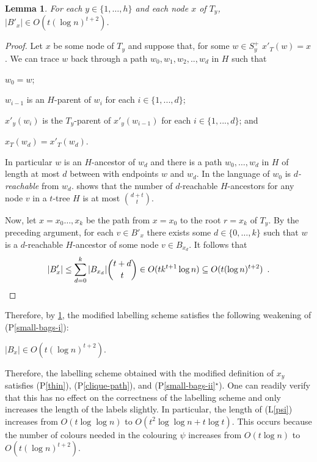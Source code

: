 \documentclass{article}
\newcommand{\pref}[1]{(P\ref{#1})}
\newcommand{\psref}[1]{(P\ref{#1}$^{\star}$)}
\newtheorem{lemma}{Lemma}
\begin{document}
\begin{lemma}\label{small-bags-ii-lem}
    For each $y\in\{1,\ldots,h\}$ and each node $x$ of $T_y$, $|B'_x|\in O(t(\log n)^{t+2})$.
\end{lemma}

\begin{proof}
    Let $x$ be some node of $T_y$ and suppose that, for some $w\in S^+_y$ $x'_T(w)=x$.  We can trace $w$ back through a path $w_0,w_1,w_2,..,w_d$ in $H$ such that
    \begin{compactenum}[(a)]
        \item $w_0=w$;
        \item $w_{i-1}$ is an $H$-parent of $w_i$ for each $i\in\{1,...,d\}$;
        \item $x'_y(w_{i})$ is the $T_y$-parent of $x'_y(w_{i-1})$ for each $i\in\{1,...,d\}$; and
        \item $x_T(w_d)=x'_T(w_d)$.
    \end{compactenum}
    In particular $w$ is an $H$-ancestor of $w_d$ and there is a path $w_0,\ldots,w_d$ in $H$ of length at most $d$ between with endpoints $w$ and $w_d$.  In the language of \citet{pilipczuk.siebertz:polynomial} $w_0$ is \emph{$d$-reachable} from $w_d$.  \citet[Lemma~13]{pilipczuk.siebertz:polynomial-arxiv} shows that the number of $d$-reachable $H$-ancestors for any node $v$ in a $t$-tree $H$ is at most $\binom{d+t}{t}$.

    Now, let $x=x_0\ldots,x_k$ be the path from $x=x_0$ to the root $r=x_k$ of $T_y$. By the preceding argument, for each $v\in B'_x$ there exists some $d\in\{0,\ldots,k\}$ such that $w$ is a $d$-reachable $H$-ancestor of some node $v\in B_{x_d}$.  It follows that
    \[
        |B'_x|
            \le \sum_{d=0}^k |B_{x_d}|\binom{t+d}{t}
            \in O(tk^{t+1}\log n)
            \subseteq O(t(\log n)^{t+2}) \enspace . \qedhere
    \]
\end{proof}

Therefore, by \cref{small-bags-ii-lem}, the modified labelling scheme satisfies the following weakening of \pref{small-bags-i}:

\begin{compactenum}[(P1$^{\star}$)]\setcounter{enumi}{2}
    \item $|B_x|\in O(t(\log n)^{t+2})$. \label{small-bags-ii}
\end{compactenum}

Therefore, the labelling scheme obtained with the modified definition of $x_y$ satisfies \pref{thin}, \pref{clique-path}, and \psref{small-bags-ii}.  One can readily verify that this has no effect on the correctness of the labelling scheme and only increases the length of the labels slightly.  In particular, the length of (L\ref{psi}) increases from $O(t\log\log n)$ to $O(t^2\log\log n + t\log t)$.  This occurs because the number of colours needed in the colouring $\psi$ increases from $O(t\log n)$ to $O(t(\log n)^{t+2})$.
\end{document}
